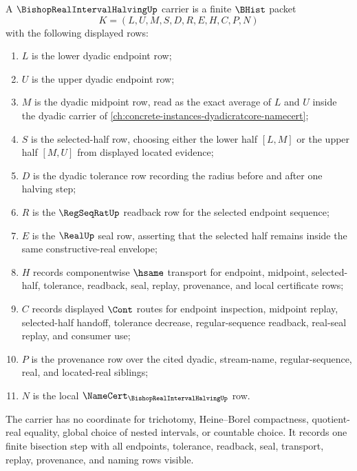 \begin{definition}
\label{def:bishop-real-interval-halving-carrier}
A $\BishopRealIntervalHalvingUp$ carrier is a finite $\BHist$ packet
$$
K=(L,U,M,S,D,R,E,H,C,P,N)
$$
with the following displayed rows:
\begin{enumerate}
\item $L$ is the lower dyadic endpoint row;
\item $U$ is the upper dyadic endpoint row;
\item $M$ is the dyadic midpoint row, read as the exact average of $L$ and $U$ inside the dyadic carrier of \autoref{ch:concrete-instances-dyadicratcore-namecert};
\item $S$ is the selected-half row, choosing either the lower half $[L,M]$ or the upper half $[M,U]$ from displayed located evidence;
\item $D$ is the dyadic tolerance row recording the radius before and after one halving step;
\item $R$ is the $\RegSeqRatUp$ readback row for the selected endpoint sequence;
\item $E$ is the $\RealUp$ seal row, asserting that the selected half remains inside the same constructive-real envelope;
\item $H$ records componentwise $\hsame$ transport for endpoint, midpoint, selected-half, tolerance, readback, seal, replay, provenance, and local certificate rows;
\item $C$ records displayed $\Cont$ routes for endpoint inspection, midpoint replay, selected-half handoff, tolerance decrease, regular-sequence readback, real-seal replay, and consumer use;
\item $P$ is the provenance row over the cited dyadic, stream-name, regular-sequence, real, and located-real siblings;
\item $N$ is the local $\NameCert_{\BishopRealIntervalHalvingUp}$ row.
\end{enumerate}
The carrier has no coordinate for trichotomy, Heine--Borel compactness, quotient-real equality, global choice of nested intervals, or countable choice. It records one finite bisection step with all endpoints, tolerance, readback, seal, transport, replay, provenance, and naming rows visible.
\end{definition}


